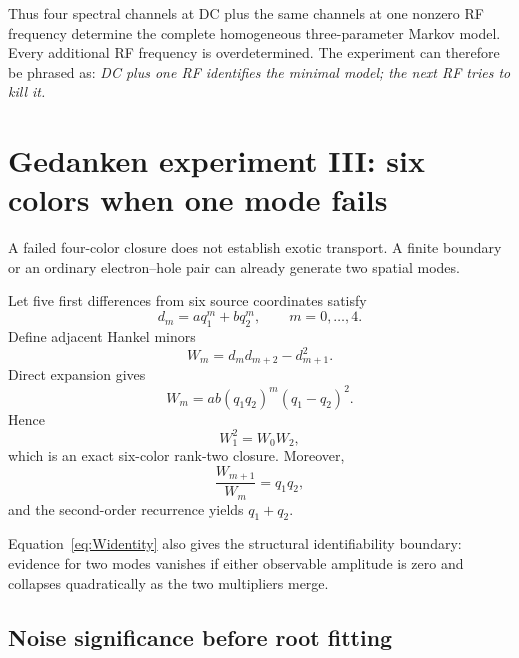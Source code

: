 \documentclass[11pt]{article}
\begin{document}
Thus four spectral channels at DC plus the same channels at one nonzero RF frequency determine the complete homogeneous three-parameter Markov model. Every additional RF frequency is overdetermined. The experiment can therefore be phrased as: \emph{DC plus one RF identifies the minimal model; the next RF tries to kill it.}

\section{Gedanken experiment III: six colors when one mode fails}

A failed four-color closure does not establish exotic transport. A finite boundary or an ordinary electron--hole pair can already generate two spatial modes.

Let five first differences from six source coordinates satisfy
\begin{equation}
d_m=a q_1^m+b q_2^m,
\qquad m=0,\ldots,4.
\label{eq:twomode}
\end{equation}
Define adjacent Hankel minors
\begin{equation}
W_m=d_md_{m+2}-d_{m+1}^2.
\end{equation}
Direct expansion gives
\begin{equation}
\boxed{W_m=ab(q_1q_2)^m(q_1-q_2)^2.}
\label{eq:Widentity}
\end{equation}
Hence
\begin{equation}
\boxed{W_1^2=W_0W_2,}
\label{eq:rank2closure}
\end{equation}
which is an exact six-color rank-two closure. Moreover,
\begin{equation}
\frac{W_{m+1}}{W_m}=q_1q_2,
\end{equation}
and the second-order recurrence yields $q_1+q_2$.

Equation~\eqref{eq:Widentity} also gives the structural identifiability boundary: evidence for two modes vanishes if either observable amplitude is zero and collapses quadratically as the two multipliers merge.

\subsection{Noise significance before root fitting}
\end{document}
